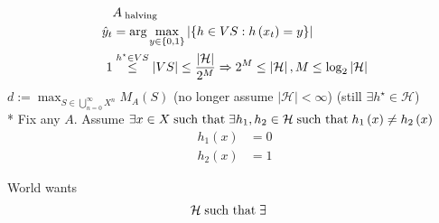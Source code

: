 \documentclass{article}
\begin{document}
\begin{align*}
&A_{\text{\;halving\;}}
\\ \hat{y}_{t} &= \arg\displaystyle\max_{y \in \left\{0, 1\right\}} \left|  \left\{h \in VS : h\left(x_{t}\right) = y\right\}  \right|
\\ 1 &\stackrel{h^\star  \in VS}{\leq} \left|  VS  \right| \leq  \dfrac{\left|  \mathcal{H}  \right|}{2^{M}} \Rightarrow  2^{M} \leq  \left|  \mathcal{H}  \right|, M \leq  \log_{2} \left|  \mathcal{H}  \right|
\end{align*}
$d  := \displaystyle\max_{S \in \displaystyle\bigcup _{n=0}^{\infty} X^{n}} M_{A}\left(S\right)$ (no longer assume $\left|  \mathcal{H}  \right| < \infty$) (still $\exists h^\star  \in \mathcal{H}$)
\\* Fix any $A $. Assume $\exists x \in X  \text{\;such that\;} \exists h_{1}, h_{2} \in \mathcal{H} \text{\;such that\;} h_{1}\left(x\right) \neq  h_{2}\left(x\right)$
\begin{align*}
h_{1}\left(x\right) &= 0
\\ h_{2}\left(x\right) &= 1
\end{align*}
\begin{figure}[H] \centering {} 
\end{figure}
World wants
\begin{align*}
&\mathcal{H} \text{\;such that\;} \exists
\end{align*}
\end{document}

